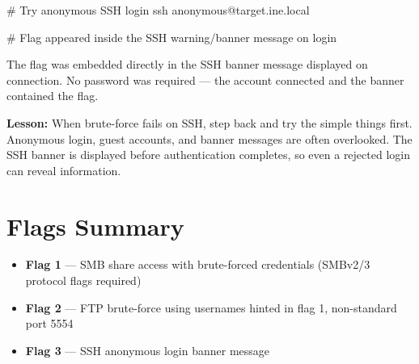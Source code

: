 \begin{termbox}
# Try anonymous SSH login
ssh anonymous@target.ine.local

# Flag appeared inside the SSH warning/banner message on login
\end{termbox}

The flag was embedded directly in the SSH banner message displayed on connection.
No password was required --- the  account connected and the banner
contained the flag.

\begin{takebox}
\textbf{Lesson:} When brute-force fails on SSH, step back and try the simple
things first. Anonymous login, guest accounts, and banner messages are often
overlooked. The SSH banner is displayed before authentication completes, so even
a rejected login can reveal information.
\end{takebox}

\section*{Flags Summary}

\begin{checkbox}
\begin{itemize}
  \item[$\checkmark$] \textbf{Flag 1} --- SMB share access with brute-forced
        credentials (SMBv2/3 protocol flags required)
  \item[$\checkmark$] \textbf{Flag 2} --- FTP brute-force using usernames
        hinted in flag 1, non-standard port 5554
  \item[$\checkmark$] \textbf{Flag 3} --- SSH anonymous login banner message
\end{itemize}
\end{checkbox}
